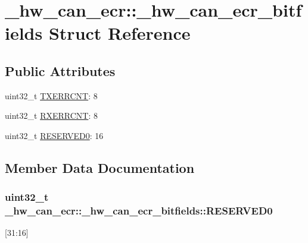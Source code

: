 \hypertarget{struct__hw__can__ecr_1_1__hw__can__ecr__bitfields}{}\section{\+\_\+hw\+\_\+can\+\_\+ecr\+:\+:\+\_\+hw\+\_\+can\+\_\+ecr\+\_\+bitfields Struct Reference}
\label{struct__hw__can__ecr_1_1__hw__can__ecr__bitfields}
\subsection*{Public Attributes}
\begin{DoxyCompactItemize}
\item 
uint32\+\_\+t \hyperlink{struct__hw__can__ecr_1_1__hw__can__ecr__bitfields_ace2b89a309d12cc580aee99499d1c1be}{T\+X\+E\+R\+R\+C\+NT}\+: 8
\item 
uint32\+\_\+t \hyperlink{struct__hw__can__ecr_1_1__hw__can__ecr__bitfields_ac73175be7f119d66559581eaf1b7be8d}{R\+X\+E\+R\+R\+C\+NT}\+: 8
\item 
uint32\+\_\+t \hyperlink{struct__hw__can__ecr_1_1__hw__can__ecr__bitfields_a5fcce293d51a4deeaa5e6c5435a32bc2}{R\+E\+S\+E\+R\+V\+E\+D0}\+: 16
\end{DoxyCompactItemize}


\subsection{Member Data Documentation}
\subsubsection[{\texorpdfstring{R\+E\+S\+E\+R\+V\+E\+D0}{RESERVED0}}]{\setlength{\rightskip}{0pt plus 5cm}uint32\+\_\+t \+\_\+hw\+\_\+can\+\_\+ecr\+::\+\_\+hw\+\_\+can\+\_\+ecr\+\_\+bitfields\+::\+R\+E\+S\+E\+R\+V\+E\+D0}\hypertarget{struct__hw__can__ecr_1_1__hw__can__ecr__bitfields_a5fcce293d51a4deeaa5e6c5435a32bc2}{}\label{struct__hw__can__ecr_1_1__hw__can__ecr__bitfields_a5fcce293d51a4deeaa5e6c5435a32bc2}
\mbox{[}31\+:16\mbox{]} 
